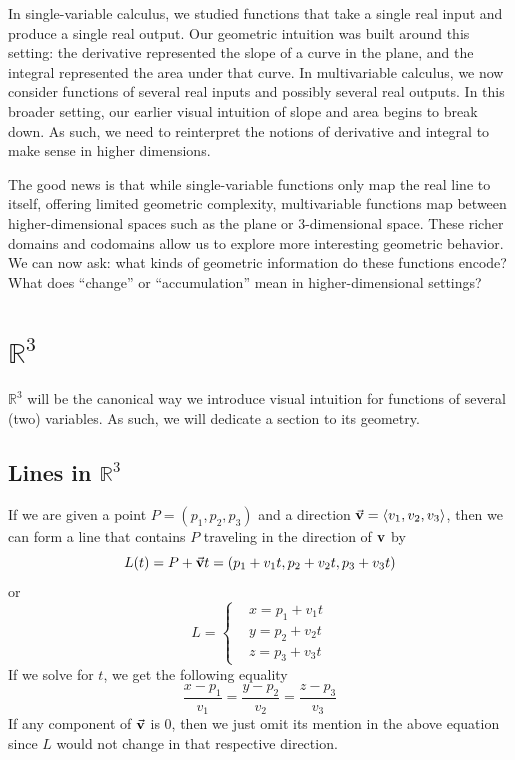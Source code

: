 In single-variable calculus, we studied functions that take a single real input and produce a single real output. Our geometric intuition was built around this setting: the derivative represented the slope of a curve in the plane, and the integral represented the area under that curve.
In multivariable calculus, we now consider functions of several real inputs and possibly several real outputs. In this broader setting, our earlier visual intuition of slope and area begins to break down. As such, we need to reinterpret the notions of derivative and integral to make sense in higher dimensions.

The good news is that while single-variable functions only map the real line to itself, offering limited geometric complexity, multivariable functions map between higher-dimensional spaces such as the plane or 3-dimensional space. These richer domains and codomains allow us to explore more interesting geometric behavior. We can now ask: what kinds of geometric information do these functions encode? What does “change” or “accumulation” mean in higher-dimensional settings?


\section{\( \mathbb{R}^{3} \)}
\( \mathbb{R}^{3} \) will be the canonical way we introduce visual intuition for functions of several (two) variables. As such, we will dedicate a section to its geometry.
\subsection{Lines in \( \mathbb{R}^{3} \)}

If we are given a point \( P = \left( p_{1}, p_{2}, p_{3} \right) \) and a direction \( \va{v} = \left< v_{1}, v_{2}, v_{3} \right> \), then we can form a line that contains \( P \) traveling in the direction of \( \vb{v} \) by 
\[ L(t) = P + \va{v}t = \left( p_{1} + v_{1}t, p_{2} + v_{2}t, p_{3} + v_{3}t \right) \]
or 
\[ L = \begin{cases}
    &x = p_{1} + v_{1}t \\
    &y = p_{2} + v_{2}t \\
    &z = p_{3} + v_{3}t
\end{cases} \]
If we solve for \( t \), we get the following equality 
\[ \frac{x-p_{1}}{v_{1}} = \frac{y-p_{2}}{v_{2}} = \frac{z-p_{3}}{v_{3}} \]
If any component of \( \va{v} \) is \( 0 \), then we just omit its mention in the above equation since \( L \) would not change in that respective direction.

